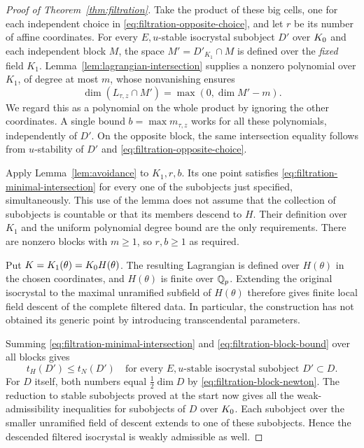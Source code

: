 \begin{proof}[Proof of Theorem~\ref{thm:filtration}]
Take the product of these big cells, one for each independent choice
in \eqref{eq:filtration-opposite-choice}, and let $r$ be its number
of affine coordinates.  For every $E,u$-stable isocrystal subobject
$D'$ over $K_0$ and each independent block $M$, the space
$M'=D'_{K_1}\cap M$ is defined over the \emph{fixed} field $K_1$.
Lemma~\ref{lem:lagrangian-intersection} supplies a nonzero polynomial
over $K_1$, of degree at most $m$, whose nonvanishing ensures
\begin{equation}
\label{eq:filtration-minimal-intersection}
 \dim(L_{\tau,z}\cap M')=\max(0,\dim M'-m).
\end{equation}
We regard this as a polynomial on the whole product by ignoring the
other coordinates.  A single bound $b=\max m_{\tau,z}$ works for all
these polynomials, independently of $D'$.  On the opposite block,
the same intersection equality follows from $u$-stability of $D'$
and \eqref{eq:filtration-opposite-choice}.

Apply Lemma~\ref{lem:avoidance} to $K_1,r,b$.  Its one point satisfies
\eqref{eq:filtration-minimal-intersection} for every one of the
subobjects just specified, simultaneously.  This use of the lemma
does not assume that the collection of subobjects is countable or
that its members descend to $H$.  Their definition over $K_1$ and
the uniform polynomial degree bound are the only requirements.
There are nonzero blocks with $m\geq1$, so $r,b\geq1$ as required.

Put $K=K_1(\theta)=K_0 H(\theta)$.  The resulting Lagrangian is
defined over $H(\theta)$ in the chosen coordinates, and $H(\theta)$
is finite over $\mathbb Q_p$.  Extending the original isocrystal to the
maximal unramified subfield of $H(\theta)$ therefore gives finite
local field descent of the complete filtered data.  In particular,
the construction has not obtained its generic point by introducing
transcendental parameters.

Summing \eqref{eq:filtration-minimal-intersection} and
\eqref{eq:filtration-block-bound} over all blocks gives
\begin{equation}
\label{eq:filtration-stable-test}
 t_H(D')\leq t_N(D')
 \quad\text{for every $E,u$-stable isocrystal subobject $D'\subset D$.}
\end{equation}
For $D$ itself, both numbers equal $\frac12\dim D$ by
\eqref{eq:filtration-block-newton}. The reduction to stable subobjects
proved at the start now gives all the weak-admissibility inequalities
for subobjects of $D$ over $K_0$. Each subobject over the smaller unramified
field of descent extends to one of these subobjects. Hence the
descended filtered isocrystal is weakly admissible as well.


\end{proof}
